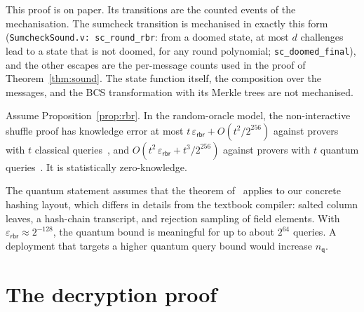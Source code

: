 \documentclass[sigconf,anonymous]{acmart}
\newcommand{\epsrbr}{\varepsilon_{\mathsf{rbr}}}
\newcommand{\nq}{n_{\mathsf{q}}}
\begin{document}
This proof is on paper. Its transitions are the counted events of the mechanisation. The sumcheck
transition is mechanised in exactly this form (\texttt{SumcheckSound.v: sc\_round\_rbr}: from a
doomed state, at most $d$ challenges lead to a state that is not doomed, for any round polynomial;
\texttt{sc\_doomed\_final}), and the other escapes are the per-message counts used in the proof of
Theorem~\ref{thm:sound}. The state function itself, the composition over the messages, and the BCS
transformation with its Merkle trees are not mechanised.

\begin{theorem}\label{thm:nizk}
Assume Proposition~\ref{prop:rbr}. In the random-oracle model, the non-interactive shuffle proof
has knowledge error at most $t\,\epsrbr+O(t^2/2^{256})$ against provers with $t$ classical
queries~\cite{BCS16,Hol19}, and $O(t^2\,\epsrbr+t^3/2^{256})$ against provers with $t$ quantum
queries~\cite[Thm.~3]{CMS19}. It is statistically zero-knowledge.
\end{theorem}

The quantum statement assumes that the theorem of~\cite{CMS19} applies to our concrete hashing
layout, which differs in details from the textbook compiler: salted column leaves, a hash-chain
transcript, and rejection sampling of field elements. With $\epsrbr\approx 2^{-128}$, the quantum
bound is meaningful for up to about $2^{64}$ queries. A deployment that targets a higher quantum
query bound would increase $\nq$.

\section{The decryption proof}
\label{sec:dec}
\end{document}
